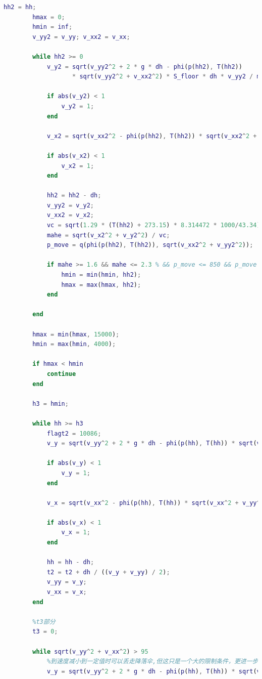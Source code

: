 \documentclass[hyperref,a4paper,UTF8]{ctexart}
\begin{document}
\begin{lstlisting}[language=Matlab]
        hh2 = hh;
        hmax = 0;
        hmin = inf;
        v_yy2 = v_yy; v_xx2 = v_xx;

        while hh2 >= 0
            v_y2 = sqrt(v_yy2^2 + 2 * g * dh - phi(p(hh2), T(hh2)) 
                   * sqrt(v_yy2^2 + v_xx2^2) * S_floor * dh * v_yy2 / m);

            if abs(v_y2) < 1
                v_y2 = 1;
            end

            v_x2 = sqrt(v_xx2^2 - phi(p(hh2), T(hh2)) * sqrt(v_xx2^2 + v_yy2^2) * S_floor * dh * v_xx2^2 / (m * v_yy2));

            if abs(v_x2) < 1
                v_x2 = 1;
            end

            hh2 = hh2 - dh;
            v_yy2 = v_y2;
            v_xx2 = v_x2;
            vc = sqrt(1.29 * (T(hh2) + 273.15) * 8.314472 * 1000/43.34);
            mahe = sqrt(v_x2^2 + v_y2^2) / vc;
            p_move = q(phi(p(hh2), T(hh2)), sqrt(v_xx2^2 + v_yy2^2));

            if mahe >= 1.6 && mahe <= 2.3 % && p_move <= 850 && p_move >= 250
                hmin = min(hmin, hh2);
                hmax = max(hmax, hh2);
            end

        end

        hmax = min(hmax, 15000);
        hmin = max(hmin, 4000);

        if hmax < hmin
            continue
        end

        h3 = hmin;

        while hh >= h3
            flagt2 = 10086;
            v_y = sqrt(v_yy^2 + 2 * g * dh - phi(p(hh), T(hh)) * sqrt(v_yy^2 + v_xx^2) * S_floor * dh * v_yy / m);

            if abs(v_y) < 1
                v_y = 1;
            end

            v_x = sqrt(v_xx^2 - phi(p(hh), T(hh)) * sqrt(v_xx^2 + v_yy^2) * S_floor * dh * v_xx^2 / (m * v_yy));

            if abs(v_x) < 1
                v_x = 1;
            end

            hh = hh - dh;
            t2 = t2 + dh / ((v_y + v_yy) / 2);
            v_yy = v_y;
            v_xx = v_x;
        end

        %t3部分
        t3 = 0;

        while sqrt(v_yy^2 + v_xx^2) > 95
            %到速度减小到一定值时可以丢走降落伞,但这只是一个大的限制条件，更进一步的条件是马赫数
            v_y = sqrt(v_yy^2 + 2 * g * dh - phi(p(hh), T(hh)) * sqrt(v_yy^2 + v_xx^2) * (S_floor + S_para) * dh * v_yy / m);


\end{lstlisting}
\end{document}
